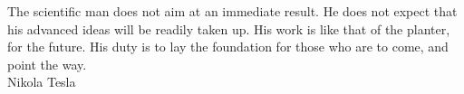 \begin{titlepage}

        \vspace*{1cm}
%        
    
   \vspace{5cm}
    \raggedright  
      The scientific man does not aim at an immediate result. He does not expect that his advanced ideas will be readily taken up. His work is like that of the planter, for the future. His duty is to lay the foundation for those who are to come, and point the way.\\
      \raggedleft
      Nikola Tesla
%        
%        
        
\end{titlepage}
